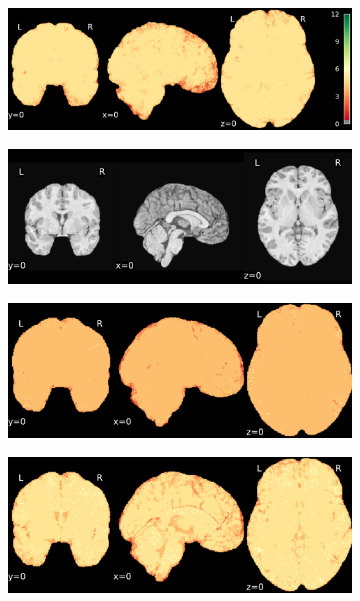 \documentclass{article}
\begin{document}
\begin{landscape}
\begin{figure}
\begin{subfigure}[t]{0.2\paperheight}
        \end{subfigure}
        \begin{subfigure}[t]{0.2\paperheight}
            \centering
            \includegraphics[width=\textwidth]{figures/sig/ds001771_sub-36_rr.rs_sig.pdf}
        \end{subfigure}
        \begin{subfigure}[t]{0.2\paperheight}
            \centering
            \includegraphics[width=\textwidth]{figures/ieee_T1/ds000256_sub-CTS201_ieee_mean.pdf}
        \end{subfigure}
        \begin{subfigure}[t]{0.2\paperheight}
            \centering
            \includegraphics[width=\textwidth]{figures/sig/ds000256_sub-CTS201_rr_sig.pdf}
        \end{subfigure}
        \begin{subfigure}[t]{0.2\paperheight}
            \centering
            \includegraphics[width=\textwidth]{figures/sig/ds000256_sub-CTS201_rs_sig.pdf}

\end{subfigure}
\end{figure}
\end{landscape}
\end{document}
